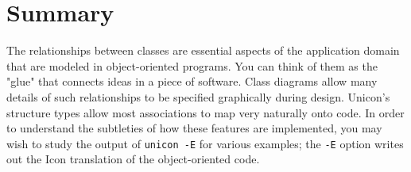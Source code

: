 \section{Summary}

The relationships between classes are essential aspects of the
application domain that are modeled in object-oriented programs. You
can think of them as the "glue" that
connects ideas in a piece of software. Class diagrams allow many
details of such relationships to be specified graphically during
design. Unicon's structure types allow most
associations to map very naturally onto code.  In order
to understand the subtleties of how these features are implemented, you
may wish to study the output of \texttt{unicon -E} for various examples;
the \texttt{-E} option writes out the Icon translation of the
object-oriented code. 
\clearpage
\bigskip
